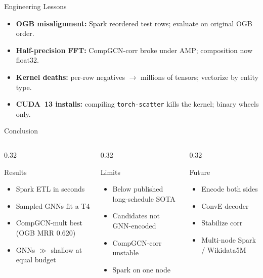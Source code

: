 \documentclass[aspectratio=43,11pt]{beamer}
\begin{document}
\begin{frame}{Engineering Lessons}
  \begin{itemize}
    \item \textbf{OGB misalignment:} Spark reordered test rows; evaluate on
          original OGB order.
    \item \textbf{Half-precision FFT:} CompGCN-corr broke under AMP;
          composition now float32.
    \item \textbf{Kernel deaths:} per-row negatives $\to$ millions of tensors;
          vectorize by entity type.
    \item \textbf{CUDA~13 installs:} compiling \texttt{torch-scatter} kills
          the kernel; binary wheels only.
  \end{itemize}
\end{frame}

\begin{frame}{Conclusion}
  \begin{columns}[T]
    \begin{column}{0.32\textwidth}
      \begin{block}{Results}
        \begin{itemize}
          \item Spark ETL in seconds
          \item Sampled GNNs fit a T4
          \item CompGCN-mult best (OGB MRR 0.620)
          \item GNNs $\gg$ shallow at equal budget
        \end{itemize}
      \end{block}
    \end{column}
    \begin{column}{0.32\textwidth}
      \begin{block}{Limits}
        \begin{itemize}
          \item Below published long-schedule SOTA
          \item Candidates not GNN-encoded
          \item CompGCN-corr unstable
          \item Spark on one node
        \end{itemize}
      \end{block}
    \end{column}
    \begin{column}{0.32\textwidth}
      \begin{block}{Future}
        \begin{itemize}
          \item Encode both sides
          \item ConvE decoder
          \item Stabilize corr
          \item Multi-node Spark / Wikidata5M
        \end{itemize}
      \end{block}
    \end{column}
  \end{columns}
\end{frame}
\end{document}
